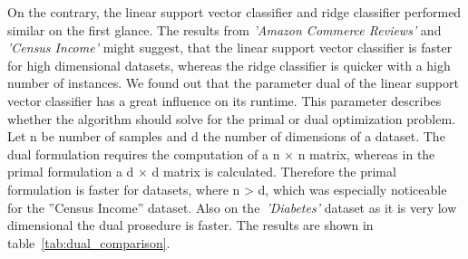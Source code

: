 \documentclass[a4paper,12pt]{article}
\begin{document}
On the contrary, the linear support vector classifier and ridge classifier performed similar
on the first glance. The results from \textit{'Amazon Commerce Reviews'} and \textit{'Census Income'} might suggest,
that the linear support vector classifier is faster for high dimensional datasets, whereas the ridge classifier
is quicker with a high number of instances. We found out that the parameter dual of the linear support
vector classifier has a great influence on its runtime. This parameter describes whether the algorithm
should solve for the primal or dual optimization problem. Let n be number of samples and d the number
of dimensions of a dataset. The dual formulation requires the computation of a n × n matrix, whereas
in the primal formulation a d × d matrix is calculated. Therefore the primal formulation is faster for
datasets, where n > d, which was especially noticeable for the ”Census Income” dataset. Also on the~\textit{'Diabetes'}
dataset as it is very low dimensional the dual prosedure is faster. The results are shown in table~\ref{tab:dual_comparison}.
\end{document}
